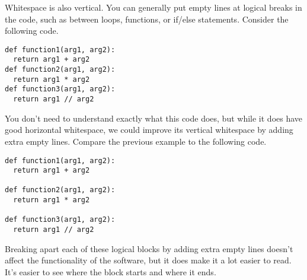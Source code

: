 Whitespace is also vertical. You can generally put empty lines at logical breaks in the code, such as between loops, functions, or if/else statements. Consider the following code.\par
\begin{lstlisting}[style=pippython]
def function1(arg1, arg2):
  return arg1 + arg2
def function2(arg1, arg2):
  return arg1 * arg2
def function3(arg1, arg2):
  return arg1 // arg2
\end{lstlisting}
You don't need to understand exactly what this code does, but while it does have good horizontal whitespace, we could improve its vertical whitespace by adding extra empty lines. Compare the previous example to the following code.\par
\begin{lstlisting}[style=pippython]
def function1(arg1, arg2):
  return arg1 + arg2

def function2(arg1, arg2):
  return arg1 * arg2

def function3(arg1, arg2):
  return arg1 // arg2
\end{lstlisting}
Breaking apart each of these logical blocks by adding extra empty lines doesn't affect the functionality of the software, but it does make it a lot easier to read. It's easier to see where the block starts and where it ends.
